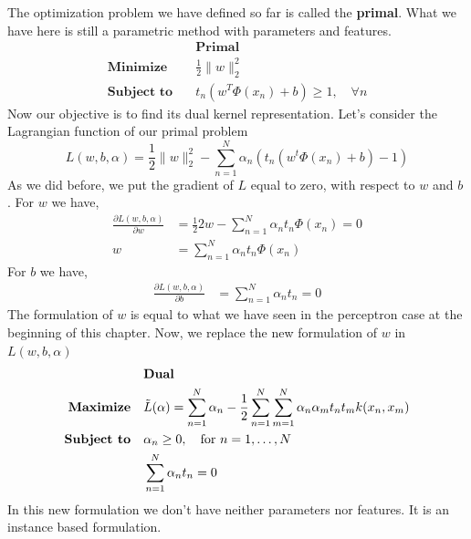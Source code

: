 \documentclass[../main.tex]{subfiles}
\begin{document}
The optimization problem we have defined so far is called the \textbf{primal}. What we have here is still a parametric method with parameters and features.
\begin{align*}
                              & \textbf{Primal}                                 \\
    \textbf{Minimize} \quad   & \frac{1}{2} \|w\|_2^2                           \\
    \textbf{Subject to} \quad & t_n (w^T \Phi(x_n) + b) \geq 1, \quad \forall n
\end{align*}
Now our objective is to find its dual kernel representation.
Let's consider the Lagrangian function of our primal problem\footnotemark {}
\begin{equation}
    L(w,b,\alpha) = \frac{1}{2} \|w\|_2^2 - \sum_{n=1}^N \alpha_n (t_n(w^t \Phi(x_n) + b) - 1)
\end{equation}
\newpage
As we did before, we put the gradient of $L$ equal to zero, with respect to $w$ and $b$ \footnotemark. 
\newline
For $w$ we have,
\begin{align*}
    \frac{\partial L(w,b,\alpha)}{\partial w} & = \frac{1}{2} 2w - \sum_{n=1}^N \alpha_n t_n \Phi(x_n) = 0 \\
    w                                         & = \sum_{n=1}^N \alpha_n t_n \Phi(x_n)
\end{align*}
For $b$ we have,
\begin{align*}
    \frac{\partial L(w,b,\alpha)}{\partial b} & = \sum_{n=1}^N \alpha_n t_n = 0
\end{align*}
The formulation of $w$ is equal to what we have seen in the perceptron case at the beginning of this chapter. Now, we replace the new formulation of $w$ in $L(w,b,\alpha)$
\begin{align*}
                              & \textbf{Dual}                                                                                                         \\
    \textbf{Maximize} \quad   & \Tilde{L}(\alpha) = \sum_{n=1}^N \alpha_n - \frac{1}{2}\sum_{n=1}^N \sum_{m=1}^N \alpha_n \alpha_m t_n t_m k(x_n,x_m) \\
    \textbf{Subject to} \quad & \alpha_n \geq 0, \quad \text{for } n=1, \dots, N                                                                      \\
                              & \sum_{n=1}^N \alpha_n t_n = 0
\end{align*}
In this new formulation we don't have neither parameters nor features. It is an instance based formulation.
\end{document}

